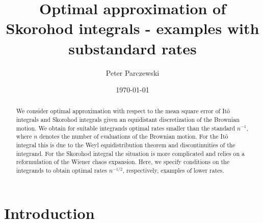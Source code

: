 \documentclass[a4paper,11pt,reqno]{amsart}
\theoremstyle{plain}
\numberwithin{equation}{section}
\begin{document}
 

 
 
\title[Optimal approximation of Skorohod integrals - examples with substandard rates]{Optimal approximation of Skorohod integrals - examples with substandard rates}\label{}
 
 
\author[P. Parczewski]{Peter Parczewski}


\address{University of Mannheim, Institute of Mathematics A5, 6, D-68131 Mannheim, Germany.}

\date{\today}

\begin{abstract}
We consider optimal approximation with respect to the mean square error of It\^o integrals and Skorohod integrals given an equidistant discretization of the Brownian motion. We obtain for suitable integrands optimal rates smaller than the standard $n^{-1}$, where $n$ denotes the number of evaluations of the Brownian motion. For the It\^o integral this is due to the Weyl equidistribution theorem and discontinuities of the integrand. For the Skorohod integral the situation is more complicated and relies on a reformulation of the Wiener chaos expansion. Here, we specify conditions on the integrands to obtain optimal rates $n^{-1/2}$, respectively, examples of lower rates.
\end{abstract}




\maketitle



\section{Introduction}
\end{document}
